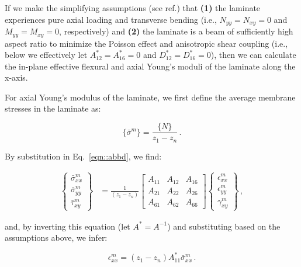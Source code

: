 \documentclass[twocolumn, linenumbers, superscriptaddress, nofootinbib]{revtex4-1}
\begin{document}
				If we make the simplifying assumptions (see ref.) that \textbf{(1)} the laminate experiences pure axial loading and transverse bending (i.e., $N_{yy} = N_{xy} = 0$ and $M_{yy} = M_{xy} = 0$, respectively) and \textbf{(2)} the laminate is a beam of sufficiently high aspect ratio to minimize the Poisson effect and anisotropic shear coupling (i.e., below we effectively let $A^*_{12} = A^*_{16} = 0$ and $D^*_{12} = D^*_{16} = 0$), then we can calculate the in-plane effective flexural and axial Young's moduli of the laminate along the x-axis.
				
				For axial Young's modulus of the laminate, we first define the average membrane stresses in the laminate as:
				
				\begin{equation}
					\{\bar{\sigma}^m\} = \frac{\{N\}}{z_1 - z_n}\,.
				\end{equation}
				
				By substitution in Eq.~\ref{eqn::abbd}, we find:
				
				\begin{equation}
					\begin{aligned}
						\begin{Bmatrix}
							\bar{\sigma}^m_{xx} \\
							\bar{\sigma}^m_{yy} \\
							\bar{\tau}^m_{xy}
						\end{Bmatrix}
						& = \frac{1}{(z_1 - z_n)}
						\begin{bmatrix}
							A_{11} & A_{12} & A_{16} \\
							A_{21} & A_{22} & A_{26} \\
							A_{61} & A_{62} & A_{66}
						\end{bmatrix}
						\begin{Bmatrix}
							\epsilon^m_{xx} \\
							\epsilon^m_{yy} \\
							\gamma^m_{xy}
						\end{Bmatrix}\,,
					\end{aligned}
				\end{equation}
				
				and, by inverting this equation (let $A^* = A^{-1}$) and substituting based on the assumptions above, we infer:
				
				\begin{equation}
					\epsilon^m_{xx} = (z_1 - z_n)A^{*}_{11}\bar{\sigma}^m_{xx}\,.
				\end{equation}
				
\end{document}
